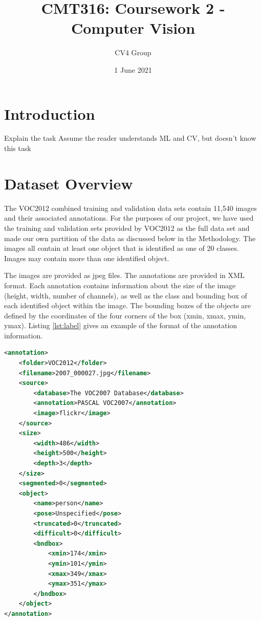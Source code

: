 \documentclass{article}
\title{CMT316: Coursework 2 - Computer Vision}
\author{CV4 Group}
\date{1 June 2021}
\begin{document}
\maketitle

\section{Introduction}

Explain the task
Assume the reader understands ML and CV, but doesn't know this task


\section{Dataset Overview}

The VOC2012 combined training and validation data sets contain 11,540 images and their associated annotations. For the purposes of our project, we have used the training and validation sets provided by VOC2012 as the full data set and made our own partition of the data as discussed below in the Methodology. The images all contain at least one object that is identified as one of 20 classes. Images may contain more than one identified object. 

The images are provided as jpeg files. The annotations are provided in XML format. Each annotation contains information about the size of the image (height, width, number of channels), as well as the class and bounding box of each identified object within the image. The bounding boxes of the objects are defined by the coordinates of the four corners of the box (xmin, xmax, ymin, ymax). Listing \ref{lst:label} gives an example of the format of the annotation information.

\begin{lstlisting}[language=XML, label={lst:label}, caption=Annotation example]
<annotation>
	<folder>VOC2012</folder>
	<filename>2007_000027.jpg</filename>
	<source>
		<database>The VOC2007 Database</database>
		<annotation>PASCAL VOC2007</annotation>
		<image>flickr</image>
	</source>
	<size>
		<width>486</width>
		<height>500</height>
		<depth>3</depth>
	</size>
	<segmented>0</segmented>
	<object>
		<name>person</name>
		<pose>Unspecified</pose>
		<truncated>0</truncated>
		<difficult>0</difficult>
		<bndbox>
			<xmin>174</xmin>
			<ymin>101</ymin>
			<xmax>349</xmax>
			<ymax>351</ymax>
		</bndbox>
	</object>
</annotation>

\end{lstlisting}
\end{document}
